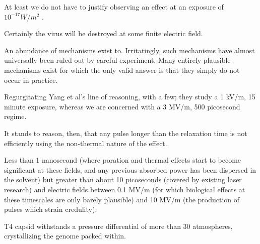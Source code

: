 \documentclass[paper.tex]{subfiles}
\begin{document}
\begin{multicols}{1}
At least we do not have to justify observing an effect at an exposure of $10^{-17} W/m^2$ \cite{Resonance1996}.

Certainly the virus will be destroyed at some finite electric field.


\clearpage 

An abundance of mechanisms exist to. Irritatingly, such mechanisms have almost universally been ruled out by careful experiment. Many entirely plausible mechanisms exist for which the only valid answer is that they simply do not occur in practice.

%
%

Regurgitating Yang et al's line of reasoning, with a few; they study a 1 kV/m, 15 minute exposure, whereas we are concerned with a 3 MV/m, 500 picosecond regime. 



It stands to reason, then, that any pulse longer than the relaxation time is not efficiently using the non-thermal nature of the effect.

Less than 1 nanosecond (where poration and thermal effects start to become significant at these fields, and any previous absorbed power has been dispersed in the solvent) but greater than about 10 picoseconds (covered by existing laser research) and electric fields between 0.1 MV/m (for which biological effects at these timescales are only barely plausible) and 10 MV/m (the production of pulses which strain credulity).






T4 capsid withstands a pressure differential of more than 30 atmospheres, crystallizing the genome packed within. \cite{Osmotic2003}



\end{multicols}
\end{document}
